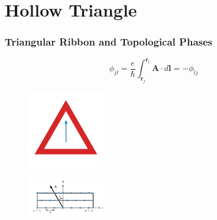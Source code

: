 \documentclass[xcolor=dvipsnames,10pt,aspectratio=169]{beamer}
\renewcommand{\vec}[1]{\mathbf{#1}}
\newcommand{\HT}{Hollow Triangle}
\begin{document}
  \section{\HT}

  \begin{frame}
    \frametitle{Triangular Ribbon and Topological Phases}

    \begin{multicols}{2}
      \small
      \begin{equation*}
        \phi_{jl} = \dfrac{e}{\hbar}\int_{\vec{r}_j}^{\vec{r}_l} \vec{A} \cdot d\vec{l} = -\phi_{lj}
      \end{equation*}
      \vspace{-08mm}
      \begin{figure}
        \includegraphics[width=0.30\textwidth]{./figures/hollow-triangle-constant-vector-potential.pdf}
      \end{figure}

      \vspace{-15mm}
      \begin{figure}
        \includegraphics[width=0.3\textwidth]{./figures/triangular-lattice-finite-width-ribbon.pdf}
      \end{figure}

      \pause


\end{multicols}
\end{frame}
\end{document}
